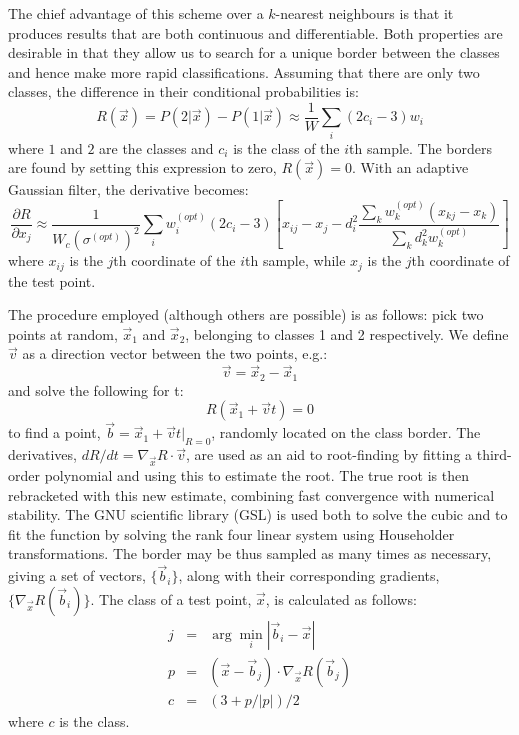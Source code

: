 The chief advantage of this scheme over a $k$-nearest neighbours is that
it produces results that are both continuous and differentiable.  
Both properties are desirable in that they allow us to search for a unique
border between the classes and hence make more rapid classifications. 
Assuming that there are
only two classes, the difference in their conditional probabilities is:
\begin{equation}
R(\vec x) = P(2 | \vec x) - P(1 | \vec x) \approx \frac{1}{W}
\sum_i (2 c_i - 3) w_i
\label{Rdef}
\end{equation}
where $1$ and $2$ are the classes and $c_i$ is the class of the $i$th sample.
The borders are found by setting this expression to zero,
$R(\vec x)=0$.  With an adaptive Gaussian filter, the derivative becomes:
\begin{equation}
\frac{\partial R}{\partial x_j} \approx \frac{1}{W_c (\sigma^{(opt)})^2}
	\sum_i w_i^{(opt)} (2 c_i - 3) \left [x_{ij}-x_j - d_i^2 \frac{\sum_k
	w_k^{(opt)} (x_{kj}-x_k)} {\sum_k d_k^2 w_k^{(opt)}} \right ] 
\label{class_grad}
\end{equation}
where $x_{ij}$ is the $j$th coordinate of the $i$th sample, while $x_j$ is the
$j$th coordinate of the test point.

The procedure employed (although others are possible)
 is as follows:  pick two points at random,
$\vec x_1$ and $\vec x_2$, belonging to classes 1 and 2 respectively.  We
define $\vec v$ as a direction vector between the two points, e.g.:
\begin{equation}
\vec v = \vec x_2 - \vec x_1
\end{equation}
and solve the following for t:
\begin{equation}
R(\vec x_1 + \vec v t) = 0
\end{equation}
to find a point,  $\vec b = \vec x_1 + \vec v t|_{R=0}$, 
randomly located on the class border.
The derivatives, $dR/dt = \nabla_{\vec x} R \cdot \vec v$, are used
 as an aid to root-finding
by fitting a third-order polynomial and using this
to estimate the root.  The true root is then rebracketed with this new estimate, 
combining fast convergence with numerical stability.
The GNU scientific library (GSL) is used both to 
solve the cubic and to fit the function by
solving the rank four linear system using Householder
transformations. \cite{gsl_ref}
\linebreak
\linebreak
The border may be thus sampled as many times as necessary,
giving a set of vectors, $\lbrace \vec b_i \rbrace$, 
along with their corresponding gradients,
$\lbrace \nabla_{\vec x} R (\vec b_i) \rbrace$.  The class of a test point,
$\vec x$, is calculated as follows:
\begin{eqnarray}
j & = & \arg \underset{i}{\min} | \vec b_i - \vec x | \label{jeq}\\
p & = & (\vec x - \vec b_j) \cdot \nabla_{\vec x} R (\vec b_j) \label{peq} \\
c & = & ( 3 + p/|p| ) / 2 \label{ceq}
\end{eqnarray}
where $c$ is the class.  

